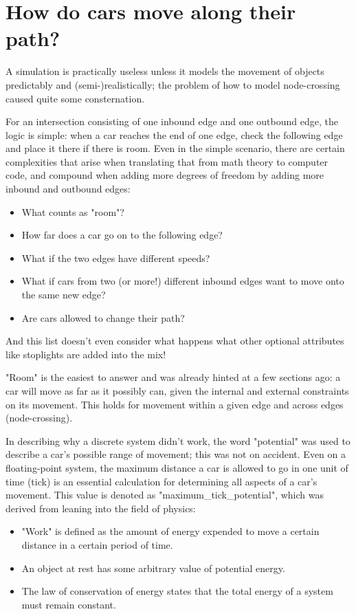 \section{How do cars move along their path?}

\par A simulation is practically useless unless it models the movement of objects predictably and (semi-)realistically; the problem of how to model node-crossing caused quite some consternation. \\

\par  For an intersection consisting of one inbound edge and one outbound edge, the logic is simple:  when a car reaches the end of one edge, check the following edge and place it there if there is room.  Even in the simple scenario, there are certain complexities that arise when translating that from math theory to computer code, and compound when adding more degrees of freedom by adding more inbound and outbound edges: 

\begin{itemize}
    \item What counts as "room"?
    \item How far does a car go on to the following edge?
    \item What if the two edges have different speeds?
    \item What if cars from two (or more!) different inbound edges want to move onto the same new edge?
    \item Are cars allowed to change their path?
\end{itemize}

\noindent And this list doesn't even consider what happens what other optional attributes like stoplights are added into the mix!\\

\par "Room" is the easiest to answer and was already hinted at a few sections ago:  a car will move as far as it possibly can, given the internal and external constraints on its movement.  This holds for movement within a given edge and across edges (node-crossing).  \\

\par In describing why a discrete system didn't work, the word "potential" was used to describe a car's possible range of movement; this was not on accident.  Even on a floating-point system, the maximum distance a car is allowed to go in one unit of time (tick) is an essential calculation for determining all aspects of a car's movement.  This value is denoted as "maximum\_tick\_potential", which was derived from leaning into the field of physics:
\begin{itemize}
    \item "Work" is defined as the amount of energy expended to move a certain distance in a certain period of time.
    \item An object at rest has some arbitrary value of potential energy.  
    \item The law of conservation of energy states that the total energy of a system must remain constant.
\end{itemize}

